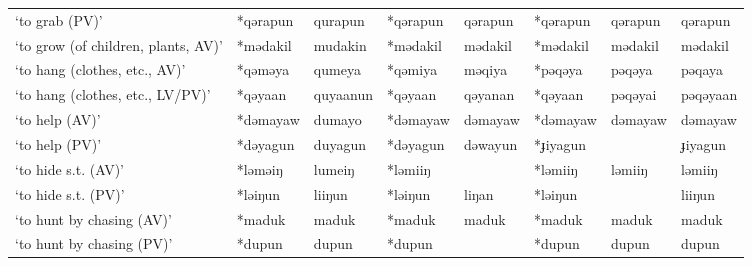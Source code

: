 \begin{landscape}
\begin{longtable}[c]{@{}p{3cm}<{\raggedright}p{2.75cm}<{\raggedright}p{2.75cm}<{\raggedright}p{2.75cm}<{\raggedright}p{2.75cm}<{\raggedright}p{2.75cm}<{\raggedright}p{2.75cm}<{\raggedright}p{2.75cm}<{\raggedright}@{}}
`to grab (PV)'                                       & *qərapun     & qurapun                       & *qərapun       & qərapun                    & *qərapun         & qərapun                  & qərapun                           \\
`to grow (of children, plants, AV)'                  & *mədakil     & mudakin                       & *mədakil       & mədakil                    & *mədakil         & mədakil                  & mədakil                           \\
`to hang (clothes, etc., AV)'                        & *qəməya      & qumeya                        & *qəmiya        & məqiya                     & *pəqəya          & pəqəya                   & pəqaya                            \\
`to hang (clothes, etc., LV/PV)'                     & *qəyaan      & quyaanun                      & *qəyaan        & qəyanan                    & *qəyaan          & pəqəyai                  & pəqəyaan                          \\
`to help (AV)'                                       & *dəmayaw     & dumayo                        & *dəmayaw       & dəmayaw                    & *dəmayaw         & dəmayaw                  & dəmayaw                           \\
`to help (PV)'                                       & *dəyagun     & duyagun                       & *dəyagun       & dəwayun                    & *ɟiyagun         &                          & ɟiyagun                           \\
`to hide s.t. (AV)'                                  & *ləməiŋ      & lumeiŋ                        & *ləmiiŋ        &                            & *ləmiiŋ          & ləmiiŋ                   & ləmiiŋ                            \\
`to hide s.t. (PV)'                                  & *ləiŋun      & liiŋun                        & *ləiŋun        & liŋan                      & *ləiŋun          &                          & liiŋun                            \\
`to hunt by chasing (AV)'                            & *maduk       & maduk                         & *maduk         & maduk                      & *maduk           & maduk                    & maduk                             \\
`to hunt by chasing (PV)'                            & *dupun       & dupun                         & *dupun         &                            & *dupun           & dupun                    & dupun                             \\

\end{longtable}
\end{landscape}
